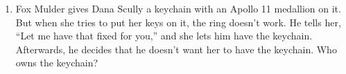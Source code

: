 \begin{enumerate}
\item Fox Mulder gives Dana Scully a keychain with an Apollo 11 medallion on it.
 But when she tries to put her keys on it, the ring doesn't work.  He tells
her, ``Let me have that fixed for you,'' and she lets him have the keychain. 
Afterwards, he decides that he doesn't want her to have the keychain.  Who owns
the keychain?
\end{enumerate}

